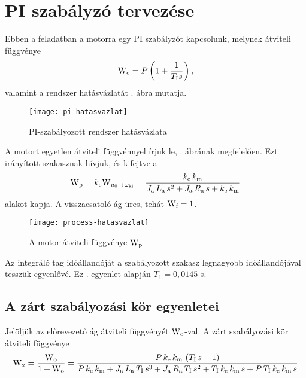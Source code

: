\section{PI szabályzó tervezése}


Ebben a feladatban a motorra egy PI szabályzót kapcsolunk, melynek átviteli függvénye
\begin{equation}
	\mathrm{W}_\text{c} = P\left(1+\frac{1}{T_\text{I}s}\right),
\end{equation}
valamint a rendszer hatásvázlatát . ábra mutatja.

\begin{figure}[H]
	\centering
	\texttt{[image: pi-hatasvazlat]}
	\caption{PI-szabályozott rendszer hatásvázlata}
	\label{fig:pi-hatasvazlat}
\end{figure}

A motort egyetlen átviteli függvénnyel írjuk le, 
. ábrának megfelelően.
Ezt irányított szakasznak hívjuk, és kifejtve a
\begin{equation}
	\mathrm{W}_\text{p} = k_\text{e}\mathrm{W}_{u_0\rightarrow\omega_\text{ki}} =
	\frac{k_\text{e}\, k_\text{m}}{J_\text{a}\, L_\text{a}\, s^2 + J_\text{a}\, R_\text{a}\, s + k_\text{e}\, k_\text{m}}
\end{equation}
alakot kapja.
A visszacsatoló ág üres, tehát $\mathrm{W}_\text{f} = 1$.

\begin{figure}[H]
	\centering
	\texttt{[image: process-hatasvazlat]}
	\caption{A motor átviteli függvénye $\mathrm{W}_\text{p}$}
	\label{fig:process-hatasvazlat}
\end{figure}

Az integráló tag időállandóját a szabályozott szakasz legnagyobb időállandójával
tesszük egyenlővé. Ez . egyenlet alapján $T_1 = 0,0145$ s.


\subsection{A zárt szabályozási kör egyenletei}

Jelöljük az előrevezető ág átviteli függvényét $\mathrm{W}_\text{o}$-val.
A zárt szabályozási kör átviteli függvénye
\begin{equation}\label{eq:W-x}
	\mathrm{W}_\text{x} = \frac{\mathrm{W}_\text{o}}{1 + \mathrm{W}_\text{o}} =
	\frac{P\, k_\text{e}\, k_\text{m}\, \left(T_\text{I}\, s + 1\right)}{P\, k_\text{e}\, k_\text{m} + J_\text{a}\, L_\text{a}\, T_\text{I}\, s^3 + J_\text{a}\, R_\text{a}\, T_\text{I}\, s^2 + T_\text{I}\, k_\text{e}\, k_\text{m}\, s + P\, T_\text{I}\, k_\text{e}\, k_\text{m}\, s}
\end{equation}

